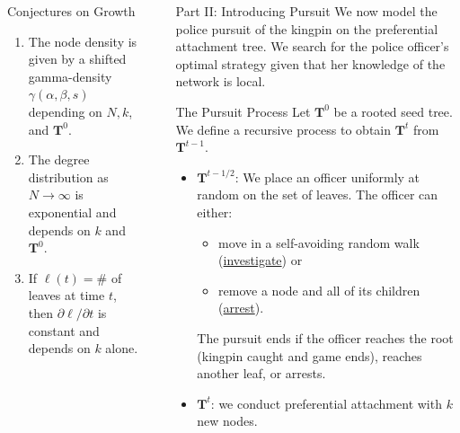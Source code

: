\documentclass[final]{beamer}
\newcommand{\bb}[1]{\textbf{#1}}
\newlength{\sepwid}
\newlength{\onecolwid}
\begin{document}
\begin{frame}[t]
\begin{columns}[t]
\begin{column}{\onecolwid}
\begin{block}{Conjectures on Growth}
\begin{enumerate}
\item The node density is given by a shifted gamma-density $\gamma(\alpha, \beta, s)$ depending on $N, k$, and $\bb T^0$.
\item The degree distribution as $N \to \infty$ is exponential and depends on $k$ and $\bb T^0$.
\item If $\ell(t) = \#$ of leaves at time $t$, then $\partial\ell/\partial t$ is constant and depends on $k$ alone.
\end{enumerate}
\end{block}

\end{column}


\begin{column}{\sepwid}\end{column}			%



    

\begin{column}{\onecolwid}					  
\begin{alertblock}{Part II: Introducing Pursuit}
We now model the police pursuit of the kingpin on the preferential attachment tree.  We search for the police officer's optimal strategy given that her knowledge of the network is local. 
\end{alertblock}
 
 \begin{block}{The Pursuit Process}
 Let $\bb T^0$ be a rooted seed tree.  We define a recursive process to obtain $\bb T^t$ from $\bb T^{t-1}$.
\begin{itemize}
\item $\bb T^{t-1/2}$:  We place an officer uniformly at random on the set of leaves.  The officer can either:
\begin{itemize}
\item move in a self-avoiding random walk (\underline{investigate}) or
\item remove a node and all of its children (\underline{arrest}).
\end{itemize}
The pursuit ends if the officer reaches the root (kingpin caught and game ends), reaches another leaf, or arrests.
\item  $\bb T^{t}$: we conduct preferential attachment with $k$ new nodes.
\end{itemize}
 \end{block}
 

\end{column}
\end{columns}
\end{frame}
\end{document}
